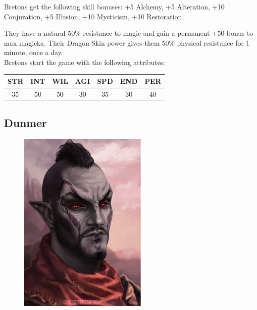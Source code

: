 \documentclass[12pt]{book}
\begin{document}
Bretons get the following skill bonuses: +5 Alchemy, +5 Alteration, +10 Conjuration, +5 Illusion, +10 Mysticism, +10 Restoration.

They have a natural 50\% resistance to magic and gain a permanent +50 bonus to max magicka. Their Dragon Skin power gives them 50\% physical resistance for 1 minute, once a day.\\

Bretons start the game with the following attributes:
\begin{center}
\begin{tabular}{|c|c|c|c|c|c|c|}
\hline
STR & INT & WIL & AGI & SPD & END & PER\\ \hline
35 & 50 & 50 & 30 & 35 & 30 & 40\\ \hline
\end{tabular}
\end{center}

\subsection{Dunmer}
\begin{figure}
	\includegraphics[width=\textwidth]{Dunmer.png}
\end{figure}
\end{document}
